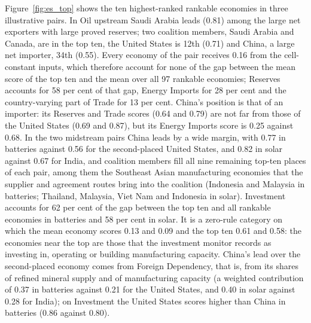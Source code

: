 Figure~\ref{fig:es_top} shows the ten highest-ranked rankable economies in three illustrative
pairs. In Oil upstream Saudi Arabia leads (0.81) among the large net exporters with large proved
reserves; two coalition members, Saudi Arabia and Canada, are in the top ten, the United States
is 12th (0.71) and China, a large net importer, 34th (0.55). Every economy of the pair receives
0.16 from the cell-constant inputs, which therefore account for none of the gap between the mean
score of the top ten and the mean over all 97 rankable economies; Reserves accounts for 58 per
cent of that gap, Energy Imports for 28 per cent and the country-varying part of Trade for 13
per cent. China's position is that of an importer: its Reserves and Trade scores (0.64 and 0.79)
are not far from those of the United States (0.69 and 0.87), but its Energy Imports score is
0.25 against 0.68. In the two midstream pairs China leads by a wide margin, with 0.77 in
batteries against 0.56 for the second-placed United States, and 0.82 in solar against 0.67 for
India, and coalition members fill all nine remaining top-ten places of each pair, among them the
Southeast Asian manufacturing economies that the supplier and agreement routes bring into the
coalition (Indonesia and Malaysia in batteries; Thailand, Malaysia, Viet Nam and Indonesia in
solar). Investment accounts for 62 per cent of the gap between the top ten and all rankable
economies in batteries and 58 per cent in solar. It is a zero-rule category on which the mean
economy scores 0.13 and 0.09 and the top ten 0.61 and 0.58: the economies near the top are those
that the investment monitor records as investing in, operating or building manufacturing
capacity. China's lead over the second-placed economy comes from Foreign Dependency, that is,
from its shares of refined mineral supply and of manufacturing capacity (a weighted contribution
of 0.37 in batteries against 0.21 for the United States, and 0.40 in solar against 0.28 for
India); on Investment the United States scores higher than China in batteries (0.86 against
0.80).



